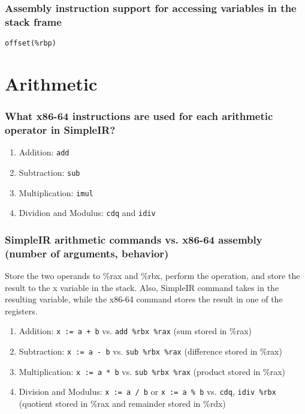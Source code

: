 \documentclass{article}
\newcommand{\inlinecode}[1]{\colorbox{gray!20}{\texttt{#1}}}
\begin{document}
\subsubsection*{Assembly instruction support for accessing variables in the stack frame}

\inlinecode{offset(\%rbp)}

\section*{Arithmetic}

\subsubsection*{What x86-64 instructions are used for each arithmetic operator in SimpleIR?}

\begin{enumerate}
    \item Addition: \inlinecode{add}
    \item Subtraction: \inlinecode{sub}
    \item Multiplication: \inlinecode{imul}
    \item Dividion and Modulus: \inlinecode{cdq} and \inlinecode{idiv}
\end{enumerate}

\subsubsection*{SimpleIR arithmetic commands vs. x86-64 assembly (number of arguments, behavior)}
Store the two operands to \%rax and \%rbx, perform the operation, and store the result to the x variable in the stack. Also, SimpleIR command takes in the resulting variable, while the x86-64 command stores the result in one of the registers.

\begin{enumerate}
    \item Addition: \inlinecode{x := a + b} vs. \inlinecode{add \%rbx \%rax} (sum stored in \%rax)
    \item Subtraction: \inlinecode{x := a - b} vs. \inlinecode{sub \%rbx \%rax} (difference stored in \%rax)
    \item Multiplication: \inlinecode{x := a * b} vs. \inlinecode{sub \%rbx \%rax} (product stored in \%rax)
    \item Division and Modulus: \inlinecode{x := a / b} or \inlinecode{x := a \% b} vs. \inlinecode{cdq}, \inlinecode{idiv \%rbx} (quotient stored in \%rax and remainder stored in \%rdx)
\end{enumerate}
\end{document}
